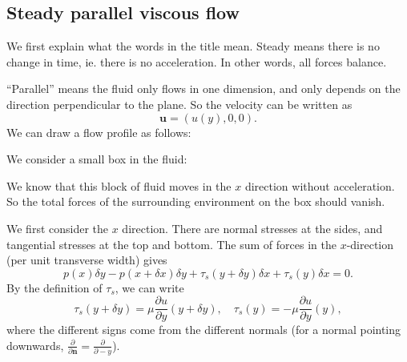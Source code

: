 \documentclass[a4paper]{article}
\begin{document}
\subsection{Steady parallel viscous flow}
We first explain what the words in the title mean. Steady means there is no change in time, ie. there is no acceleration. In other words, all forces balance.

``Parallel'' means the fluid only flows in one dimension, and only depends on the direction perpendicular to the plane. So the velocity can be written as
\[
  \mathbf{u} = (u(y), 0, 0).
\]
We can draw a flow profile as follows:
\begin{center}
\end{center}
We consider a small box in the fluid:
\begin{center}
\end{center}
We know that this block of fluid moves in the $x$ direction without acceleration. So the total forces of the surrounding environment on the box should vanish.

We first consider the $x$ direction. There are normal stresses at the sides, and tangential stresses at the top and bottom. The sum of forces in the $x$-direction (per unit transverse width) gives
\[
  p(x) \delta y - p(x + \delta x) \delta y + \tau_s(y + \delta y) \delta x + \tau_s(y) \delta x = 0.
\]
By the definition of $\tau_s$, we can write
\[
  \tau_s(y + \delta y) = \mu \frac{\partial u}{\partial y}(y + \delta y),\quad \tau_s (y) = -\mu \frac{\partial u}{\partial y}(y),
\]
where the different signs come from the different normals (for a normal pointing downwards, $\frac{\partial}{\partial \mathbf{n}} = \frac{\partial}{\partial -y}$).
\end{document}
